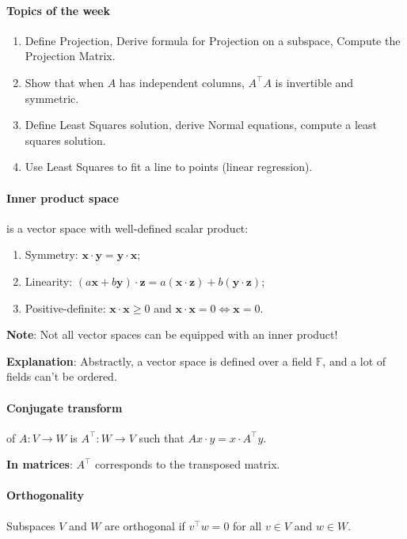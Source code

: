 \documentclass{article}
\begin{document}
\paragraph{Topics of the week} 

\begin{enumerate}
    \item Define Projection, Derive formula for Projection on a subspace, Compute the Projection Matrix.
    \item Show that when $A$ has independent columns, $A^\top A$ is invertible and symmetric.
    \item Define Least Squares solution, derive Normal equations, compute a least squares solution.
    \item Use Least Squares to fit a line to points (linear regression).
\end{enumerate}

\paragraph{Inner product space} is a vector space with well-defined scalar product:

\begin{enumerate}
    \item Symmetry: $\mathbf{x} \cdot \mathbf{y} = \mathbf{y} \cdot \mathbf{x}$;
    \item Linearity: $(a \mathbf{x} + b\mathbf{y}) \cdot \mathbf{z} = a (\mathbf{x} \cdot \mathbf{z}) + b (\mathbf{y} \cdot \mathbf{z})$;
    \item Positive-definite: $\mathbf{x} \cdot \mathbf{x} \geq 0$ and $\mathbf{x} \cdot \mathbf{x} = 0 \iff \mathbf{x} = 0$.
\end{enumerate}

\textbf{Note}: Not all vector spaces can be equipped with an inner product!

\textbf{Explanation}: Abstractly, a vector space is defined over a field $\mathbb F$, and a lot of fields can't be ordered.

\paragraph{Conjugate transform} of $A : V \to W$ is $ A^\top : W \to V$ such that $Ax \cdot y = x \cdot A^\top y$.

\textbf{In matrices}: $A^\top$ corresponds to the transposed matrix.

\paragraph{Orthogonality} Subspaces $V$ and $W$ are orthogonal if $v^\top w = 0$ for all $v \in V$ and $w \in W$.
\end{document}
